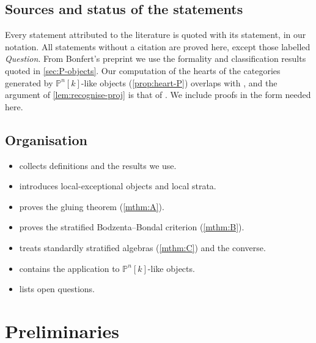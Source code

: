 \documentclass[11pt,reqno]{amsart}
\theoremstyle{plain}
\theoremstyle{definition}
\theoremstyle{remark}
\newcommand{\Pn}[2]{\mathbb{P}^{#1}[#2]}
\begin{document}
\subsection*{Sources and status of the statements}
Every statement attributed to the literature is quoted with its statement, in our notation. All statements without a citation are proved here, except those labelled \emph{Question}. From Bonfert's preprint \cite{Bonf26} we use the formality and classification results quoted in \cref{sec:P-objects}. Our computation of the hearts of the categories generated by $\Pn nk$-like objects (\cref{prop:heart-P}) overlaps with \cite[Lemmas~3.11 and~4.15]{Bonf26}, and the argument of \cref{lem:recognise-proj} is that of \cite[Lemma~3.12]{Bonf26}. We include proofs in the form needed here.

\subsection*{Organisation}
\begin{itemize}
\item {} collects definitions and the results we use.
\item {} introduces local-exceptional objects and local strata.
\item {} proves the gluing theorem (\cref{mthm:A}).
\item {} proves the stratified Bodzenta--Bondal criterion (\cref{mthm:B}).
\item {} treats standardly stratified algebras (\cref{mthm:C}) and the converse.
\item {} contains the application to $\Pn nk$-like objects.
\item {} lists open questions.
\end{itemize}

\section{Preliminaries}\label{sec:prelim}
\end{document}
